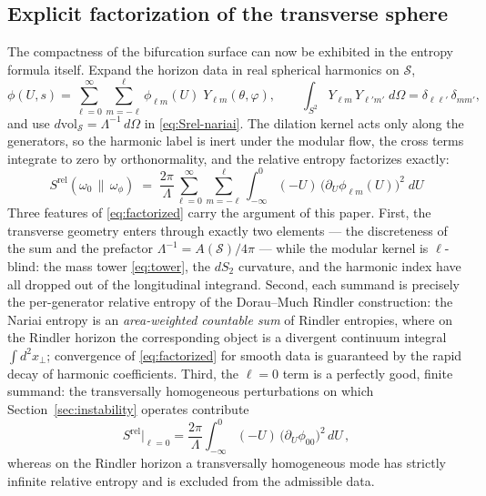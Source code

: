 \documentclass[11pt]{article}
\newcommand{\Srel}{S^{\mathrm{rel}}}
\newcommand{\Nariai}{Nariai}
\begin{document}
\subsection{Explicit factorization of the transverse sphere}
\label{sec:factorization}

The compactness of the bifurcation surface can now be exhibited in the entropy formula itself. Expand the horizon data in real spherical harmonics on $\mathcal{S}$,
\begin{equation}
\phi(U, s) = \sum_{\ell = 0}^{\infty} \sum_{m = -\ell}^{\ell} \phi_{\ell m}(U)\; Y_{\ell m}(\theta, \varphi),
\qquad
\int_{S^2} Y_{\ell m}\, Y_{\ell' m'}\; d\Omega = \delta_{\ell \ell'}\, \delta_{m m'},
\end{equation}
and use $d\mathrm{vol}_{\mathcal{S}} = \Lambda^{-1}\, d\Omega$ in \eqref{eq:Srel-nariai}. The dilation kernel acts only along the generators, so the harmonic label is inert under the modular flow, the cross terms integrate to zero by orthonormality, and the relative entropy factorizes exactly:
\begin{equation}
\boxed{\;
\Srel(\omega_0\,\|\,\omega_\phi)
\;=\; \frac{2\pi}{\Lambda} \sum_{\ell = 0}^{\infty} \sum_{m=-\ell}^{\ell}
\int_{-\infty}^{0} (-U)\, \big(\partial_U \phi_{\ell m}(U)\big)^2 \; dU
\;}
\label{eq:factorized}
\end{equation}
Three features of \eqref{eq:factorized} carry the argument of this paper. First, the transverse geometry enters through exactly two elements --- the discreteness of the sum and the prefactor $\Lambda^{-1} = A(\mathcal{S})/4\pi$ --- while the modular kernel is $\ell$-blind: the mass tower \eqref{eq:tower}, the $dS_2$ curvature, and the harmonic index have all dropped out of the longitudinal integrand. Second, each summand is precisely the per-generator relative entropy of the Dorau--Much Rindler construction: the \Nariai{} entropy is an \emph{area-weighted countable sum} of Rindler entropies, where on the Rindler horizon the corresponding object is a divergent continuum integral $\int d^2 x_\perp$; convergence of \eqref{eq:factorized} for smooth data is guaranteed by the rapid decay of harmonic coefficients. Third, the $\ell = 0$ term is a perfectly good, finite summand: the transversally homogeneous perturbations on which Section~\ref{sec:instability} operates contribute
\begin{equation}
\Srel\big|_{\ell = 0}
= \frac{2\pi}{\Lambda} \int_{-\infty}^{0} (-U)\, \big(\partial_U \phi_{00}\big)^2\, dU\,,
\label{eq:swave-entropy}
\end{equation}
whereas on the Rindler horizon a transversally homogeneous mode has strictly infinite relative entropy and is excluded from the admissible data.
\end{document}
